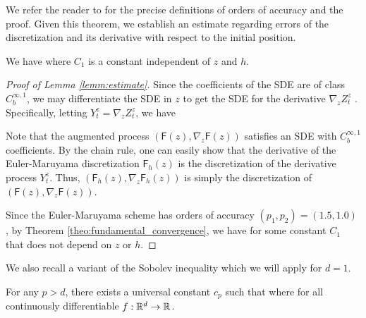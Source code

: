 \documentclass[twoside]{article}
\begin{document}
We refer the reader to \citep{milstein2013stochastic} for the precise definitions of orders of accuracy and the proof. Given this theorem, we establish an estimate regarding errors of the discretization and its derivative with respect to the initial position.

\begin{lemm}\label{lemm:estimate}
We have
where $C_1$ is a constant independent of $z$ and $h$.
\end{lemm}

\begin{proof}[Proof of Lemma \ref{lemm:estimate}]
Since the coefficients of the SDE are of class $C_b^{\infty, 1}$, we may differentiate the SDE in $z$ to get the SDE for the derivative $\nabla_z Z^z_t$ \citep{kunita2019stochastic}. 
Specifically, letting $Y_t^z = \nabla_z Z_t^z$, we have


Note that the augmented process $(\mathsf{F}(z), \nabla_z \mathsf{F}(z))$ satisfies an SDE with $C_b^{\infty, 1}$ coefficients. 
By the chain rule, one can easily show that the derivative of the Euler-Maruyama discretization $\mathsf{F}_h(z)$ is the discretization of the derivative process $Y_t^z$. 
Thus, $(\mathsf{F}_h(z), \nabla_z \mathsf{F}_h(z))$ is simply the discretization of $(\mathsf{F}(z), \nabla_z \mathsf{F}(z))$.

Since the Euler-Maruyama scheme has orders of accuracy $(p_1, p_2) = (1.5, 1.0)$ \citep[Section 1.1.5]{milstein2013stochastic}, by Theorem \ref{theo:fundamental_convergence}, we have 
for some constant $C_1$ that does not depend on $z$ or $h$.
\end{proof}


We also recall a variant of the Sobolev inequality which we will apply for $d = 1$.

\begin{theo}\label{theo:Sobolev}
For any $p > d$, there exists a universal constant $c_p$ such that 
where 
for all continuously differentiable $f: \mathbb{R}^d \to \mathbb{R}$.
\end{theo}
\end{document}
